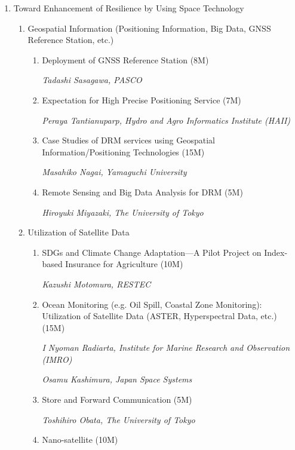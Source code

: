{\begin{enumerate}
\begin{enumerate}
	\textit{Quentin Verspieren, The University of Tokyo}
	\end{enumerate}

\item Toward Enhancement of Resilience by Using Space Technology

	\begin{enumerate}

	\item Geospatial Information (Positioning Information, Big Data, GNSS Reference Station, etc.)
	
		\begin{enumerate}
		\item Deployment of GNSS Reference Station (8M)
		
		\textit{Tadashi Sasagawa, PASCO}
		\item Expectation for High Precise Positioning Service (7M)
		
		\textit{Peraya Tantianuparp, Hydro and Agro Informatics Institute (HAII)}
		\item Case Studies of DRM services using Geospatial Information/Positioning Technologies (15M)
		
		\textit{Masahiko Nagai, Yamaguchi University}
		\item Remote Sensing and Big Data Analysis for DRM (5M)
		
		\textit{Hiroyuki Miyazaki, The University of Tokyo}
		\end{enumerate} 

	\item Utilization of Satellite Data
		
		\begin{enumerate}
		\item SDGs and Climate Change Adaptation—A Pilot Project on Index-based Insurance for Agriculture (10M)
		
		\textit{Kazushi Motomura, RESTEC}
		\item Ocean Monitoring (e.g. Oil Spill, Coastal Zone Monitoring): Utilization of Satellite Data (ASTER, Hyperspectral Data, etc.) (15M)
		
		\textit{I Nyoman Radiarta, Institute for Marine Research and Observation (IMRO)}
		
		\textit{Osamu Kashimura, Japan Space Systems}
		\item Store and Forward Communication (5M)
		
		\textit{Toshihiro Obata, The University of Tokyo}
		\item Nano-satellite (10M)
		

\end{enumerate}
\end{enumerate}
\end{enumerate}}
